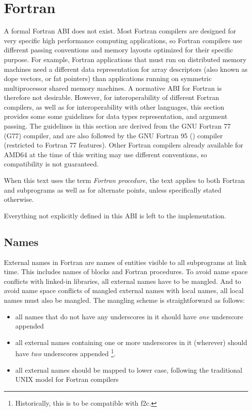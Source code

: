 \section{Fortran}

A formal Fortran ABI does not exist.  Most Fortran compilers are
designed for very specific high performance computing applications, so
Fortran compilers use different passing conventions and memory layouts
optimized for their specific purpose.  For example, Fortran
applications that must run on distributed memory machines need a
different data representation for array descriptors (also known as
dope vectors, or fat pointers) than applications running on symmetric
multiprocessor shared memory machines.  A normative ABI for Fortran is
therefore not desirable.  However, for interoperability of different
Fortran compilers, as well as for interoperability with other
languages, this section provides some some guidelines for data types
representation, and argument passing.  The guidelines in this section
are derived from the GNU Fortran 77 (G77) compiler, and are also
followed by the GNU Fortran 95 () compiler (restricted to
Fortran 77 features).  Other Fortran
compilers already available for AMD64 at the time of this writing may
use different conventions, so compatibility is not guaranteed.

When this text uses the term {\em Fortran procedure}, the text applies
to both Fortran  and  subprograms as
well as for alternate  points,
unless specifically stated otherwise.

Everything not explicitly defined in this ABI is left to the implementation.

\subsection{Names}
\label{sub_fortran_names}

External names in Fortran are names of entities visible to all
subprograms at link time.  This includes names of  blocks
and Fortran procedures.
To avoid name space conflicts with linked-in libraries, all external
names have to be mangled.  And to avoid name space conflicts
of mangled external names with local names, all local names must also
be mangled.
The mangling scheme is straightforward as follows:
\begin{itemize}
\item all names that do not have any underscores in it should have
{\em one} underscore appended
\item all external names containing one or
   more underscores in it (wherever) should have {\em two} underscores
   appended \footnote{Historically, this is to be compatible with f2c.}.
\item all external names should be mapped to lower case,
   following the traditional UNIX model for Fortran compilers
\end{itemize}

